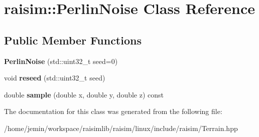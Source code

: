 \hypertarget{classraisim_1_1PerlinNoise}{}\section{raisim\+:\+:Perlin\+Noise Class Reference}
\label{classraisim_1_1PerlinNoise}
\subsection*{Public Member Functions}
\begin{DoxyCompactItemize}
\item 
\mbox{\label{classraisim_1_1PerlinNoise_a9807e1bce829704d73408a4d431cddf3}} 
{\bfseries Perlin\+Noise} (std\+::uint32\+\_\+t seed=0)
\item 
\mbox{\label{classraisim_1_1PerlinNoise_ab986f1c57f9dc74959e658a3fa204f8b}} 
void {\bfseries reseed} (std\+::uint32\+\_\+t seed)
\item 
\mbox{\label{classraisim_1_1PerlinNoise_a1160faf11f764bbb16aab2c734325005}} 
double {\bfseries sample} (double x, double y, double z) const
\end{DoxyCompactItemize}


The documentation for this class was generated from the following file\+:\begin{DoxyCompactItemize}
\item 
/home/jemin/workspace/raisimlib/raisim/linux/include/raisim/Terrain.\+hpp\end{DoxyCompactItemize}
